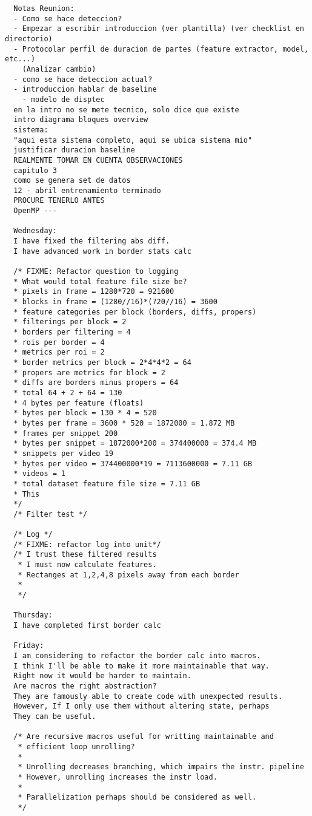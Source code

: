 \documentclass[12pt,oneside]{book}
\begin{document}
\begin{lstlisting}
  Notas Reunion:
  - Como se hace deteccion?
  - Empezar a escribir introduccion (ver plantilla) (ver checklist en directorio)
  - Protocolar perfil de duracion de partes (feature extractor, model, etc...)
    (Analizar cambio)
  - como se hace deteccion actual?
  - introduccion hablar de baseline
    - modelo de disptec
  en la intro no se mete tecnico, solo dice que existe
  intro diagrama bloques overview
  sistema:
  "aqui esta sistema completo, aqui se ubica sistema mio"
  justificar duracion baseline
  REALMENTE TOMAR EN CUENTA OBSERVACIONES
  capitulo 3
  como se genera set de datos
  12 - abril entrenamiento terminado
  PROCURE TENERLO ANTES
  OpenMP ---

  Wednesday:
  I have fixed the filtering abs diff.
  I have advanced work in border stats calc

  /* FIXME: Refactor question to logging
  * What would total feature file size be?
  * pixels in frame = 1280*720 = 921600
  * blocks in frame = (1280//16)*(720//16) = 3600
  * feature categories per block (borders, diffs, propers)
  * filterings per block = 2
  * borders per filtering = 4
  * rois per border = 4
  * metrics per roi = 2
  * border metrics per block = 2*4*4*2 = 64
  * propers are metrics for block = 2
  * diffs are borders minus propers = 64
  * total 64 + 2 + 64 = 130
  * 4 bytes per feature (floats)
  * bytes per block = 130 * 4 = 520
  * bytes per frame = 3600 * 520 = 1872000 = 1.872 MB
  * frames per snippet 200
  * bytes per snippet = 1872000*200 = 374400000 = 374.4 MB
  * snippets per video 19
  * bytes per video = 374400000*19 = 7113600000 = 7.11 GB
  * videos = 1
  * total dataset feature file size = 7.11 GB
  * This
  */
  /* Filter test */

  /* Log */
  /* FIXME: refactor log into unit*/
  /* I trust these filtered results
   * I must now calculate features.
   * Rectanges at 1,2,4,8 pixels away from each border
   * 
   */

  Thursday:
  I have completed first border calc

  Friday:
  I am considering to refactor the border calc into macros.
  I think I'll be able to make it more maintainable that way.
  Right now it would be harder to maintain.
  Are macros the right abstraction?
  They are famously able to create code with unexpected results.
  However, If I only use them without altering state, perhaps
  They can be useful.

  /* Are recursive macros useful for writting maintainable and
   * efficient loop unrolling?
   *
   * Unrolling decreases branching, which impairs the instr. pipeline
   * However, unrolling increases the instr load.
   *
   * Parallelization perhaps should be considered as well.
   */


\end{lstlisting}
\end{document}
